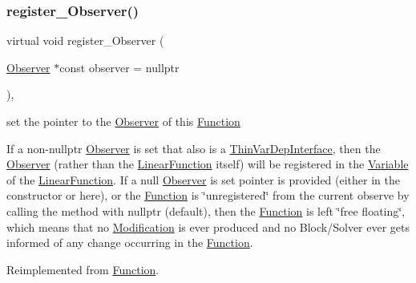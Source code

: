 \subsubsection{\texorpdfstring{register\+\_\+\+Observer()}{register\_Observer()}}
{\footnotesize\ttfamily virtual void register\+\_\+\+Observer (\begin{DoxyParamCaption}\item[{\mbox{\hyperlink{class_s_m_spp__di__unipi__it_1_1_observer}{Observer}} $\ast$const}]{observer = {\ttfamily nullptr} }\end{DoxyParamCaption})\hspace{0.3cm}{\ttfamily [override]}, {\ttfamily [virtual]}}



set the pointer to the \mbox{\hyperlink{class_s_m_spp__di__unipi__it_1_1_observer}{Observer}} of this \mbox{\hyperlink{class_s_m_spp__di__unipi__it_1_1_function}{Function}} 

If a non-\/nullptr \mbox{\hyperlink{class_s_m_spp__di__unipi__it_1_1_observer}{Observer}} is set that also is a \mbox{\hyperlink{class_s_m_spp__di__unipi__it_1_1_thin_var_dep_interface}{Thin\+Var\+Dep\+Interface}}, then the \mbox{\hyperlink{class_s_m_spp__di__unipi__it_1_1_observer}{Observer}} (rather than the \mbox{\hyperlink{class_s_m_spp__di__unipi__it_1_1_linear_function}{Linear\+Function}} itself) will be registered in the \mbox{\hyperlink{class_s_m_spp__di__unipi__it_1_1_variable}{Variable}} of the \mbox{\hyperlink{class_s_m_spp__di__unipi__it_1_1_linear_function}{Linear\+Function}}. If a null \mbox{\hyperlink{class_s_m_spp__di__unipi__it_1_1_observer}{Observer}} is set pointer is provided (either in the constructor or here), or the \mbox{\hyperlink{class_s_m_spp__di__unipi__it_1_1_function}{Function}} is \char`\"{}unregistered\char`\"{} from the current observe by calling the method with nullptr (default), then the \mbox{\hyperlink{class_s_m_spp__di__unipi__it_1_1_function}{Function}} is left \char`\"{}free floating\char`\"{}, which means that no \mbox{\hyperlink{class_s_m_spp__di__unipi__it_1_1_modification}{Modification}} is ever produced and no Block/\+Solver ever gets informed of any change occurring in the \mbox{\hyperlink{class_s_m_spp__di__unipi__it_1_1_function}{Function}}. 

Reimplemented from \mbox{\hyperlink{class_s_m_spp__di__unipi__it_1_1_function_a98c3b08492e868f06dfc9b5ada04cb8a}{Function}}.

\mbox{\label{class_s_m_spp__di__unipi__it_1_1_linear_function_a93e2cec0e8b8fbd10ad9bd5c5136a99a}} 
